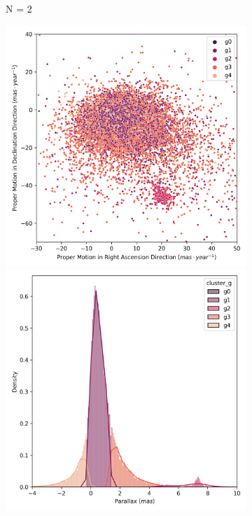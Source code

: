\documentclass[preprint,12pt,authoryear]{elsarticle}
\begin{document}
\begin{figure}[!htbp]
\begin{subfigure}[b]{0.3\textwidth}
      \caption{N = 2}
  \end{subfigure}
  \medskip
  \begin{subfigure}[b]{0.3\textwidth}
    \centering
      \includegraphics[width=\textwidth]{../figures/kmeans/kmeans_n5_pm_melotte_22.png}
      \includegraphics[width=\textwidth]{../figures/kmeans/kmeans_n5_parallax_melotte_22.png}

\end{subfigure}
\end{figure}
\end{document}
